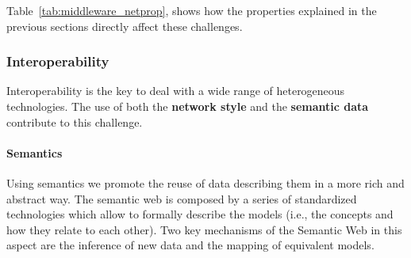 Table~\ref{tab:middleware_netprop}, shows how the properties explained in the previous sections directly affect these challenges.







\subsubsection{Interoperability}


Interoperability is the key to deal with a wide range of heterogeneous technologies.
The use of both the \textbf{network style} and the \textbf{semantic data} contribute to this challenge.


\paragraph{Semantics}

Using semantics we promote the reuse of data describing them in a more rich and abstract way.
The semantic web is composed by a series of standardized technologies which allow to formally describe the models (i.e., the concepts and how they relate to each other).
Two key mechanisms of the Semantic Web in this aspect are the inference of new data and the mapping of equivalent models.




